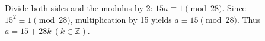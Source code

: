 Divide both sides and the modulus by 2: $15a\equiv1\pmod{28}$. Since $15^2\equiv1\pmod{28}$, multiplication by 15 yields $a\equiv15\pmod{28}$. Thus $\boxed{a=15+28k\ (k\in\mathbb Z)}$.
